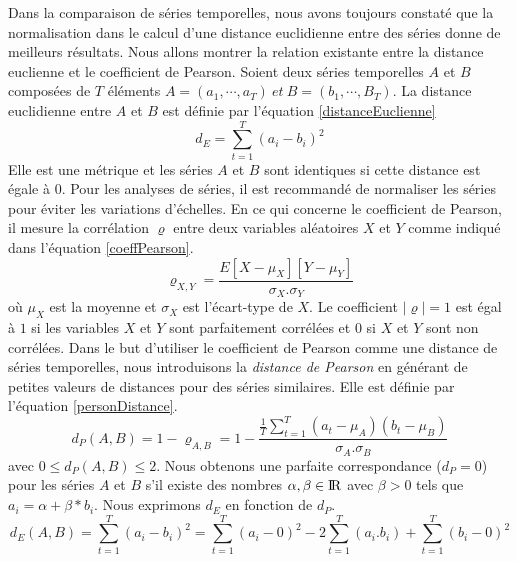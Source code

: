 Dans la comparaison de s\'eries temporelles, nous avons toujours constat\'e que la normalisation dans le calcul d'une distance euclidienne entre des s\'eries donne de meilleurs r\'esultats.
Nous allons montrer la relation existante entre la distance euclienne et le coefficient de Pearson.
\newline
Soient deux s\'eries temporelles $A$ et $B$ compos\'ees de $T$ \'el\'ements $A=(a_1, \cdots, a_T) ~et~ B=(b_1, \cdots, B_T)$.
La distance euclidienne entre  $A$ et $B$ est d\'efinie par l'\'equation \ref{distanceEuclienne}
\begin{equation}
\label{distanceEuclienne}
d_E = \sum_{t=1}^{T}(a_i - b_i)^{2}
\end{equation}
Elle est une m\'etrique et les s\'eries $A$ et $B$ sont identiques si cette distance est \'egale \`a $0$. Pour les analyses de s\'eries, il est recommand\'e de normaliser les s\'eries pour \'eviter les variations d'\'echelles.
En ce qui concerne le coefficient de Pearson, il mesure la corr\'elation $\varrho$  entre deux variables al\'eatoires $X$ et $Y$ comme indiqu\'e dans l'\'equation \ref{coeffPearson}.
\begin{equation}
\label{coeffPearson}
 \varrho_{X,Y} = \frac{ E[X - \mu_{X}][ Y - \mu_{Y}] }{\sigma_X . \sigma_Y} 
\end{equation}
o\`u $\mu_{X}$ est la moyenne  et $\sigma_{X}$ est l'\'ecart-type de $X$.
Le coefficient $|\varrho| = 1$ est \'egal \`a  
$1$ si les variables $X$ et $Y$ sont parfaitement corr\'el\'ees et 
$0$ si $X$ et $Y$ sont non corr\'el\'ees.
\newline
Dans le but d'utiliser le coefficient de Pearson comme une distance de s\'eries temporelles, nous introduisons la {\em distance de Pearson} en g\'en\'erant de petites valeurs de distances pour des s\'eries similaires. %
Elle est d\'efinie par l'\'equation \ref{personDistance}.
\begin{equation}
\label{personDistance}
d_{P}(A,B) = 1 - \varrho_{A,B}= 1- \frac{ \frac{1}{T} \sum_{t=1}^{T} (a_t - \mu_A)(b_t - \mu_B) }{\sigma_A . \sigma_B}
\end{equation}
avec $0 \le d_P{(A,B)} \le 2$.
Nous obtenons une parfaite correspondance ($d_P = 0$) pour les s\'eries $A$ et $B$ s'il existe des nombres $\alpha, \beta \in \mbox{I\hspace{-.15em}R}$ avec $\beta>0$ tels que $a_i = \alpha + \beta * b_i$.
Nous exprimons $d_E$ en fonction de $d_P$.
\begin{equation}
\label{demontrationPearson}
d_E(A,B) = \sum_{t=1}^{T}(a_i - b_i)^{2}
=  \sum_{t=1}^{T}(a_i - 0)^{2} -2 \sum_{t=1}^{T}(a_i . b_i) + \sum_{t=1}^{T}(b_i - 0)^{2}
\end{equation}
